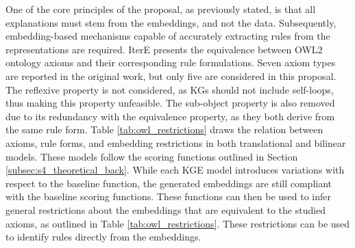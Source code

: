 One of the core principles of the proposal, as previously stated, is that all explanations must stem from the embeddings, and not the data. Subsequently, embedding-based mechanisms capable of accurately extracting rules from the representations are required. IterE \citep{itere} presents the equivalence between OWL2 ontology axioms and their corresponding rule formulations. Seven axiom types are reported in the original work, but only five are considered in this proposal. The reflexive property is not considered, as KGs should not include self-loops, thus making this property unfeasible.  The sub-object property is also removed due to its redundancy with the equivalence property, as they both derive from the same rule form. Table \ref{tab:owl_restrictions} draws the relation between axioms, rule forms, and embedding restrictions in both translational and bilinear models. These models follow the scoring functions outlined in Section \ref{subsec:s4_theoretical_back}. While each KGE model introduces variations with respect to the baseline function, the generated embeddings are still compliant with the baseline scoring functions. These functions can then be used to infer general restrictions about the embeddings that are equivalent to the studied axioms, as outlined in Table \ref{tab:owl_restrictions}. These restrictions can be used to identify rules directly from the embeddings.

\begin{table}[t]
\caption{Relation of object properties with their corresponding rule forms. Inferred mathematical restrictions under the two KGE assumptions (Bilinear and Translational) are provided. $M$ and $v$ denote the relation matrices and vectors, respectively.}
\label{tab:owl_restrictions}
\end{table}

